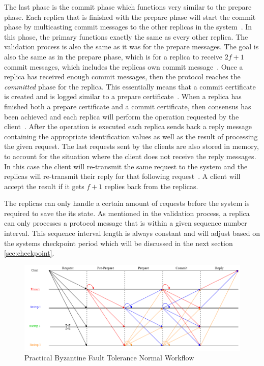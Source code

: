 The last phase is the commit phase which functions very similar to the prepare phase. Each replica that is finished with the prepare phase will start the commit phase by multicasting commit messages to the other replicas in the system~\cite[p.~4]{PAPER:OGPBFT}. In this phase, the primary functions exactly the same as every other replica. The validation process is also the same as it was for the prepare messages. The goal is also the same as in the prepare phase, which is for a replica to receive $2f+1$ commit messages, which includes the replicas own commit message~\cite[p.~5]{PAPER:OGPBFT}. Once a replica has received enough commit messages, then the protocol reaches the \emph{committed} phase for the replica. This essentially means that a commit certificate is created and is logged similar to a prepare certificate~\cites[p.~409]{PAPER:PBFTRecovery}[p.~457]{BOOK:MVstandver3}. When a replica has finished both a prepare certificate and a commit certificate, then consensus has been achieved and each replica will perform the operation requested by the client~\cites[p.~409]{PAPER:PBFTRecovery}[p.~5]{PAPER:OGPBFT}. After the operation is executed each replica sends back a reply message containing the appropriate identification values as well as the result of processing the given request. The last requests sent by the clients are also stored in memory, to account for the situation where the client does not receive the reply messages. In this case the client will re-transmit the same request to the system and the replicas will re-transmit their reply for that following request~\cite[p.~409]{PAPER:PBFTRecovery}. A client will accept the result if it gets $f+1$ replies back from the replicas. 

The replicas can only handle a certain amount of requests before the system is required to save the its state. As mentioned in the validation process, a replica can only processes a protocol message that is within a given sequence number interval. This sequence interval length is always constant and will adjust based on the systems checkpoint period which will be discussed in the next section \autoref{sec:checkpoint}\cites[p.~262]{BOOK:BuildDepDistSyst}[p.~4-5]{PAPER:OGPBFT}.

\begin{figure}[!h]
	\centering
	\includegraphics[width=\linewidth]{figures/PBFTWorkflow}
	\caption{Practical Byzantine Fault Tolerance Normal Workflow}
	\label{fig:pbftnormalworkflow}
\end{figure}

